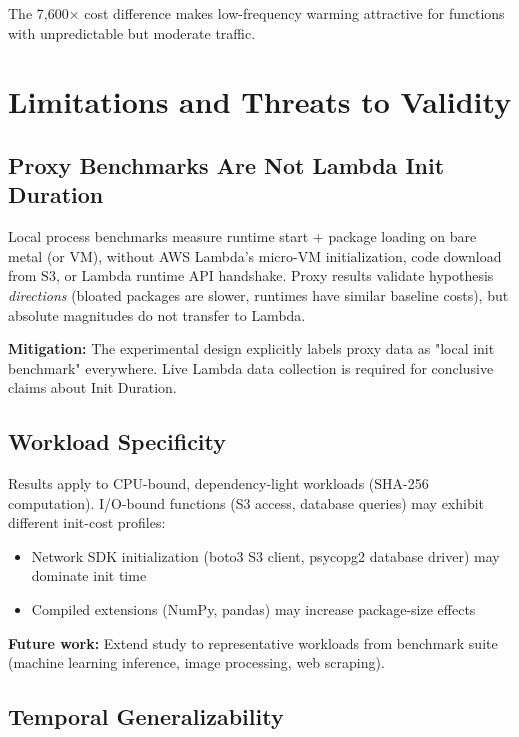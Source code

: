 The 7,600× cost difference makes low-frequency warming attractive for functions with unpredictable but moderate traffic.

\section{Limitations and Threats to Validity}

\subsection{Proxy Benchmarks Are Not Lambda Init Duration}

Local process benchmarks measure runtime start + package loading on bare metal (or VM), without AWS Lambda's micro-VM initialization, code download from S3, or Lambda runtime API handshake. Proxy results validate hypothesis \textit{directions} (bloated packages are slower, runtimes have similar baseline costs), but absolute magnitudes do not transfer to Lambda.

\textbf{Mitigation:} The experimental design explicitly labels proxy data as "local init benchmark" everywhere. Live Lambda data collection is required for conclusive claims about Init Duration.

\subsection{Workload Specificity}

Results apply to CPU-bound, dependency-light workloads (SHA-256 computation). I/O-bound functions (S3 access, database queries) may exhibit different init-cost profiles:

\begin{itemize}
    \item Network SDK initialization (boto3 S3 client, psycopg2 database driver) may dominate init time
    \item Compiled extensions (NumPy, pandas) may increase package-size effects
\end{itemize}

\textbf{Future work:} Extend study to representative workloads from \citet{copik2021sebs} benchmark suite (machine learning inference, image processing, web scraping).

\subsection{Temporal Generalizability}

